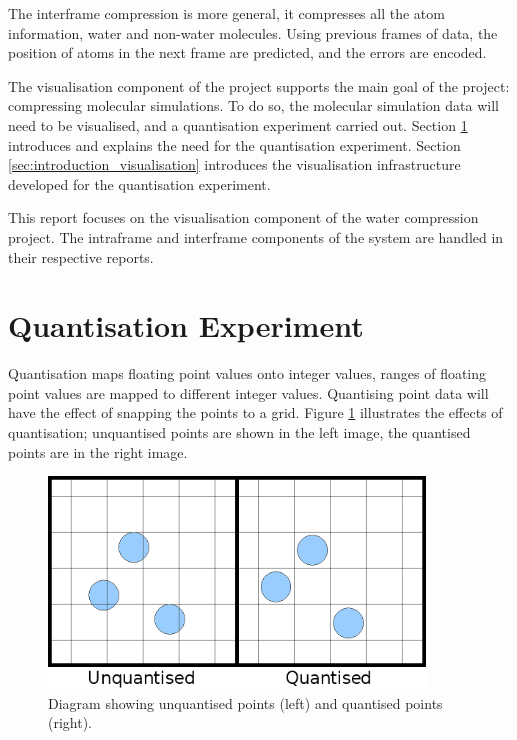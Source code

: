 The interframe compression is more general, it compresses all the atom
information, water and non-water molecules. Using previous frames of data, the
position of atoms in the next frame are predicted, and the errors are encoded.

The visualisation component of the project supports the main goal of the project:
compressing molecular simulations. To do so, the molecular simulation data will
need to be visualised, and a quantisation experiment carried out. Section
\ref{sec:introduction_quantisation} introduces and explains the need for the
quantisation experiment. Section \ref{sec:introduction_visualisation}
introduces the visualisation infrastructure developed for the quantisation
experiment.

This report focuses on the visualisation component of the water compression
project. The intraframe and interframe components of the system are handled in
their respective reports.


\section{Quantisation Experiment}
\label{sec:introduction_quantisation}

Quantisation maps floating point values onto integer values, ranges of floating
point values are mapped to different integer values. Quantising point data
will have the effect of snapping the points to a grid. Figure
\ref{fig:introduction_quantisation} illustrates the effects of quantisation;
unquantised points are shown in the left image, the quantised points are in the
right image.

\begin{figure}
  \begin{center}
    \includegraphics[width=100mm]{quantisation}
  \end{center}
  \caption{Diagram showing unquantised points (left) and quantised points
  (right).}
  \label{fig:introduction_quantisation}
\end{figure}

